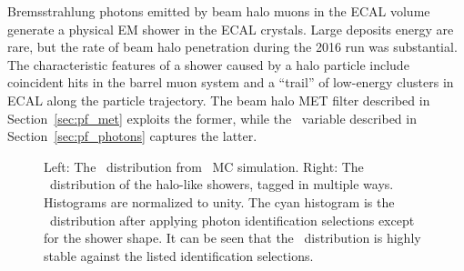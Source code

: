 Bremsstrahlung photons emitted by beam halo muons in the ECAL volume generate a physical EM shower in the ECAL crystals. 
Large deposits energy are rare, but the rate of beam halo penetration during the 2016 run was substantial. 
The characteristic features of a shower caused by a halo particle include coincident hits in the barrel muon system and a ``trail'' of low-energy clusters in ECAL along the particle trajectory. 
The beam halo MET filter described in Section~\ref{sec:pf_met} exploits the former, while the \emip\ variable described in Section~\ref{sec:pf_photons} captures the latter.

\begin{figure}[htbp]
  \centering
  \caption{
    Left: The \phig\ distribution from \zinvg\ MC simulation. \qquad \qquad
    Right: The \phig\ distribution of the halo-like showers, tagged in multiple ways. 
    Histograms are normalized to unity.
    The cyan histogram is the \phig\ distribution after applying photon identification selections except for the shower shape. 
    It can be seen that the \phig\ distribution is highly stable against the listed identification selections.
  }
  \label{fig:halophi}
\end{figure}

